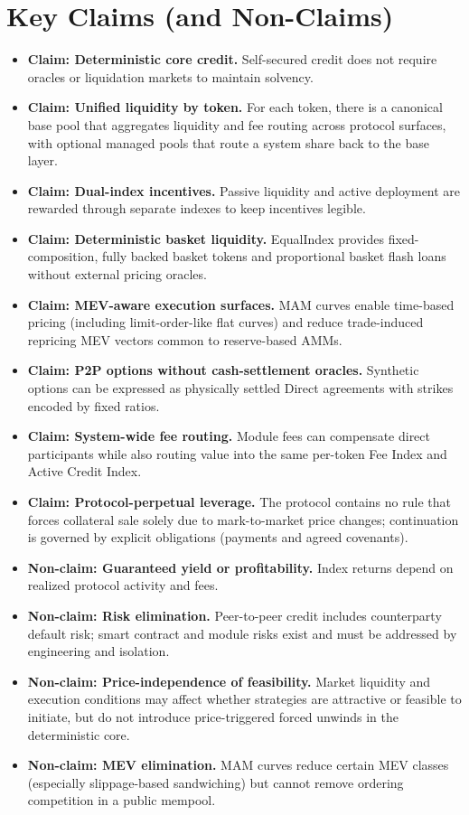 \documentclass[version=preprint]{iacrcc}
\begin{document}
\section*{Key Claims (and Non-Claims)}
\begin{itemize}
  \item \textbf{Claim: Deterministic core credit.} Self-secured credit does not require oracles or liquidation markets to maintain solvency.
  \item \textbf{Claim: Unified liquidity by token.} For each token, there is a canonical base pool that aggregates liquidity and fee routing across protocol surfaces, with optional managed pools that route a system share back to the base layer.
  \item \textbf{Claim: Dual-index incentives.} Passive liquidity and active deployment are rewarded through separate indexes to keep incentives legible.
  \item \textbf{Claim: Deterministic basket liquidity.} EqualIndex provides fixed-composition, fully backed basket tokens and proportional basket flash loans without external pricing oracles.
  \item \textbf{Claim: MEV-aware execution surfaces.} MAM curves enable time-based pricing (including limit-order-like flat curves) and reduce trade-induced repricing MEV vectors common to reserve-based AMMs.
  \item \textbf{Claim: P2P options without cash-settlement oracles.} Synthetic options can be expressed as physically settled Direct agreements with strikes encoded by fixed ratios.
  \item \textbf{Claim: System-wide fee routing.} Module fees can compensate direct participants while also routing value into the same per-token Fee Index and Active Credit Index.
  \item \textbf{Claim: Protocol-perpetual leverage.} The protocol contains no rule that forces collateral sale solely due to mark-to-market price changes; continuation is governed by explicit obligations (payments and agreed covenants).

  \item \textbf{Non-claim: Guaranteed yield or profitability.} Index returns depend on realized protocol activity and fees.
  \item \textbf{Non-claim: Risk elimination.} Peer-to-peer credit includes counterparty default risk; smart contract and module risks exist and must be addressed by engineering and isolation.
  \item \textbf{Non-claim: Price-independence of feasibility.} Market liquidity and execution conditions may affect whether strategies are attractive or feasible to initiate, but do not introduce price-triggered forced unwinds in the deterministic core.
  \item \textbf{Non-claim: MEV elimination.} MAM curves reduce certain MEV classes (especially slippage-based sandwiching) but cannot remove ordering competition in a public mempool.
\end{itemize}
\end{document}
